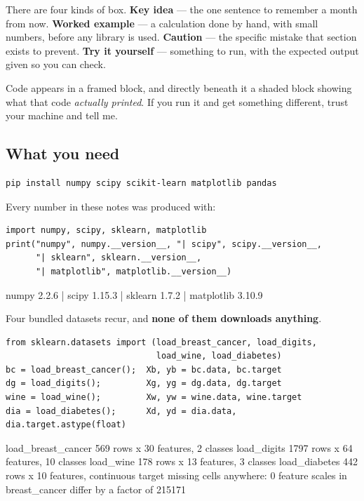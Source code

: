 \documentclass[11pt]{article}
\begin{document}
There are four kinds of box. \textbf{Key idea} --- the one sentence to
remember a month from now. \textbf{Worked example} --- a calculation done by
hand, with small numbers, before any library is used. \textbf{Caution} --- the
specific mistake that section exists to prevent. \textbf{Try it yourself} ---
something to run, with the expected output given so you can check.

Code appears in a framed block, and directly beneath it a shaded block showing
what that code \emph{actually printed}. If you run it and get something
different, trust your machine and tell me.

\subsection{What you need}

\begin{lstlisting}
pip install numpy scipy scikit-learn matplotlib pandas
\end{lstlisting}

Every number in these notes was produced with:

\begin{lstlisting}
import numpy, scipy, sklearn, matplotlib
print("numpy", numpy.__version__, "| scipy", scipy.__version__,
      "| sklearn", sklearn.__version__,
      "| matplotlib", matplotlib.__version__)
\end{lstlisting}
\begin{codeout}
numpy 2.2.6 | scipy 1.15.3 | sklearn 1.7.2 | matplotlib 3.10.9
\end{codeout}

Four bundled datasets recur, and \textbf{none of them downloads anything}.

\begin{lstlisting}
from sklearn.datasets import (load_breast_cancer, load_digits,
                              load_wine, load_diabetes)
bc = load_breast_cancer();  Xb, yb = bc.data, bc.target
dg = load_digits();         Xg, yg = dg.data, dg.target
wine = load_wine();         Xw, yw = wine.data, wine.target
dia = load_diabetes();      Xd, yd = dia.data, dia.target.astype(float)
\end{lstlisting}
\begin{codeout}
load_breast_cancer 569 rows x 30 features, 2 classes
load_digits        1797 rows x 64 features, 10 classes
load_wine          178 rows x 13 features, 3 classes
load_diabetes      442 rows x 10 features, continuous target
missing cells anywhere: 0
feature scales in breast_cancer differ by a factor of 215171
\end{codeout}
\end{document}
